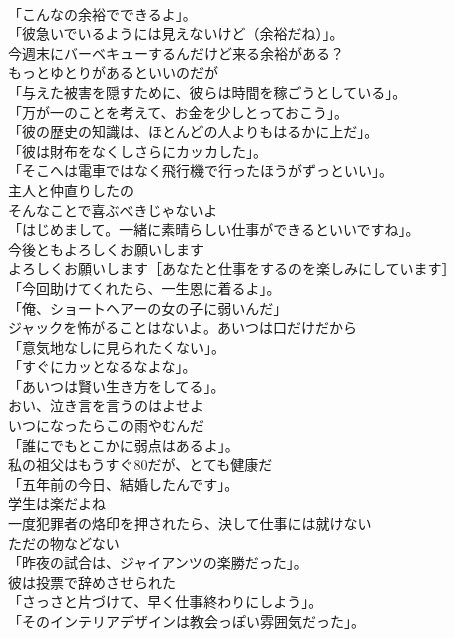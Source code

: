 \documentclass[8pt]{extreport}
\begin{document}
\begin{CJK}{UTF8}{min}
\\	「こんなの余裕でできるよ」。	
\\	「彼急いでいるようには見えないけど（余裕だね）」。	
\\	今週末にバーベキューするんだけど来る余裕がある？	
\\	もっとゆとりがあるといいのだが	
\\	「与えた被害を隠すために、彼らは時間を稼ごうとしている」。	
\\	「万が一のことを考えて、お金を少しとっておこう」。	
\\	「彼の歴史の知識は、ほとんどの人よりもはるかに上だ」。	
\\	「彼は財布をなくしさらにカッカした」。	
\\	「そこへは電車ではなく飛行機で行ったほうがずっといい」。	
\\	主人と仲直りしたの	
\\	そんなことで喜ぶべきじゃないよ	
\\	「はじめまして。一緒に素晴らしい仕事ができるといいですね」。	
\\	今後ともよろしくお願いします	
\\	よろしくお願いします［あなたと仕事をするのを楽しみにしています］	
\\	「今回助けてくれたら、一生恩に着るよ」。	
\\	「俺、ショートヘアーの女の子に弱いんだ」	
\\	ジャックを怖がることはないよ。あいつは口だけだから	
\\	「意気地なしに見られたくない」。	
\\	「すぐにカッとなるなよな」。	
\\	「あいつは賢い生き方をしてる」。	
\\	おい、泣き言を言うのはよせよ	
\\	いつになったらこの雨やむんだ	
\\	「誰にでもとこかに弱点はあるよ」。	
\\	私の祖父はもうすぐ80だが、とても健康だ	
\\	「五年前の今日、結婚したんです」。	
\\	学生は楽だよね	
\\	一度犯罪者の烙印を押されたら、決して仕事には就けない	
\\	ただの物などない	
\\	「昨夜の試合は、ジャイアンツの楽勝だった」。	
\\	彼は投票で辞めさせられた	
\\	「さっさと片づけて、早く仕事終わりにしよう」。	
\\	「そのインテリアデザインは教会っぽい雰囲気だった」。	

\end{CJK}
\end{document}
